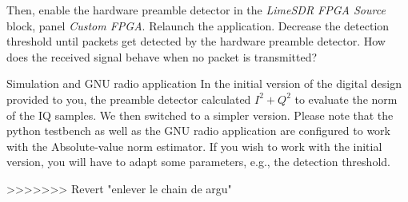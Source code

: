Then, enable the hardware preamble detector in the \textit{LimeSDR FPGA Source} block, panel \textit{Custom FPGA}. Relaunch the application. Decrease the detection threshold until packets get detected by the hardware preamble detector. How does the received signal behave when no packet is transmitted?

\begin{bclogo}[couleur = gray!20, arrondi = 0.2, logo=\bcinfo]{Simulation and GNU radio application}
In the initial version of the digital design provided to you, the preamble detector calculated $I^2+Q^2$ to evaluate the norm of the IQ samples. We then switched to a simpler version. Please note that the python testbench as well as the GNU radio application are configured to work with the Absolute-value norm estimator. If you wish to work with the initial version, you will have to adapt some parameters, e.g., the detection threshold.
\end{bclogo}
>>>>>>> Revert "enlever le chain de argu"
